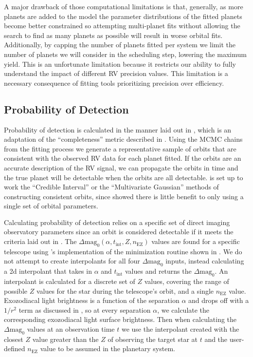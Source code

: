 A major drawback of those computational limitations is that, generally, as more
planets are added to the model the parameter distributions of the fitted
planets become better constrained so attempting multi-planet fits without
allowing the search to find as many planets as possible will result in worse
orbital fits. Additionally, by capping the number of planets fitted per system
we limit the number of planets we will consider in the scheduling step,
lowering the maximum yield. This is an unfortunate limitation because it
restricts our ability to fully understand the impact of different RV precision
values. This limitation is a necessary consequence of fitting tools prioritizing
precision over efficiency.

\subsection{Probability of Detection}

Probability of detection is calculated in the manner laid out in
, which is an adaptation of the ``completeness'' metric
described in \citet{brownSingleVisitPhotometric2005}. Using the MCMC chains
from the fitting process we generate a representative sample of orbits that are
consistent with the observed RV data for each planet fitted. If the orbits are
an accurate description of the RV signal, we can propagate the orbits in time
and the true planet will be detectable when the orbits are all detectable.
 is set up to work the ``Credible Interval'' or the
``Multivariate Gaussian'' methods of constructing consistent orbits, since
 showed there is little benefit to only using a single
set of orbital parameters.

Calculating probability of detection relies on a specific set of direct imaging
observatory parameters since an orbit is considered detectable if it meets the
criteria laid out in . The
$\Delta\textrm{mag}_0(\alpha, t_{\textrm{int}}, Z, n_\textrm{EZ})$ values are
found for a specific telescope using 's
implementation of the minimization routine shown in 
. We do not attempt to create
interpolants for all four $\Delta\textrm{mag}_0$ inputs, instead calculating a
2d interpolant that takes in $\alpha$ and $t_\textrm{int}$ values and returns
the $\Delta\textrm{mag}_0$. An interpolant is calculated for a discrete set of
$Z$ values, covering the range of possible $Z$ values for the star during the
telescope's orbit, and a single $n_\textrm{EZ}$ value. Exozodiacal light
brightness is a function of the separation $\alpha$ and drops off with a
$1/r^2$ term as discussed in \citet{starkMaximizingExoEarthCandidate2014}, so
at every separation $\alpha$, we calculate the corresponding exozodiacal light
surface brightness. Then when calculating the $\Delta\textrm{mag}_0$ values at
an observation time $t$ we use the interpolant created with the closest $Z$
value greater than the $Z$ of observing the target star at $t$ and the
user-defined $n_\textrm{EZ}$ value to be assumed in the planetary system. 

